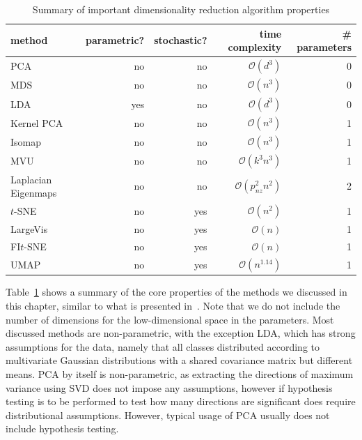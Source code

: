 \begin{table}
  \centering
  \begin{tabular}{lrrrr}
    \toprule
    method     & parametric? & stochastic? & time complexity       & \# parameters \\ \midrule
    PCA        & no          & no          & $\mathcal{O}(d^3)$    & 0            \\
    MDS        & no          & no          & $\mathcal{O}(n^3)$    & 0            \\
    LDA        & yes         & no          & $\mathcal{O}(d^3)$    & 0            \\
    Kernel PCA & no          & no          & $\mathcal{O}(n^3)$    & 1            \\
    Isomap     & no          & no          & $\mathcal{O}(n^3)$    & 1            \\
    MVU        & no          & no          & $\mathcal{O}(k^3n^3)$ & 1            \\
    Laplacian Eigenmaps & no & no & $\mathcal{O}(p_{nz}^2n^2)$ & 2 \\
    $t$-SNE & no & yes & $\mathcal{O}(n^2)$ & 1 \\
    LargeVis & no & yes & $\mathcal{O}(n)$ & 1 \\
    FI$t$-SNE & no & yes & $\mathcal{O}(n)$ & 1 \\
    UMAP & no & yes & $\mathcal{O}(n^{1.14})$ & 1 \\
    \bottomrule
  \end{tabular}
  \caption{Summary of important dimensionality reduction algorithm properties}
  \label{tab:summ-rw}
\end{table}

Table~\ref{tab:summ-rw} shows a summary of the core properties of the methods
we discussed in this chapter, similar to what is presented
in~\cite{vandermaaten_review}. Note that we do not include the number of
dimensions for the low-dimensional space in the parameters. Most discussed
methods are non-parametric, with the exception LDA, which has strong
assumptions for the data, namely that all classes distributed according to
multivariate Gaussian distributions with a shared covariance matrix but
different means. PCA by itself is non-parametric, as extracting the directions
of maximum variance using SVD does not impose any assumptions, however if
hypothesis testing is to be performed to test how many directions are
significant does require distributional assumptions. However, typical usage of
PCA usually does not include hypothesis testing.

